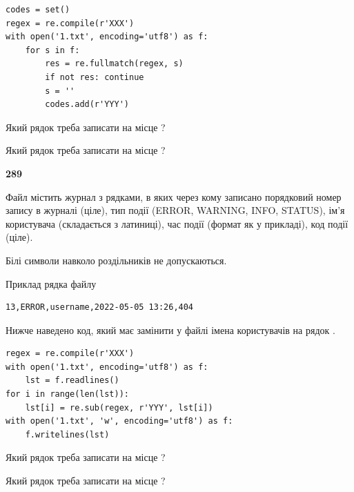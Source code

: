 \begin{verbatim}
codes = set()
regex = re.compile(r'XXX')
with open('1.txt', encoding='utf8') as f:
    for s in f:
        res = re.fullmatch(regex, s)
        if not res: continue
        s = ''
        codes.add(r'YYY')
\end{verbatim}





Який рядок треба записати на місце  ?\par
\vspace{5mm}


Який рядок треба записати на місце  ?\par


\newpage

{\begin {center}\textbf{ 289}\end {center}}\par
Файл  містить журнал з рядками, в яких через кому записано поряд\-ко\-вий номер запису в журналі (ціле), тип події (ERROR, WARNING, INFO, STATUS), ім'я користувача (складається з латиниці), час події (фор\-мат як у прикладі), код події (ціле).

Білі символи навколо роздільників не допускаються.

Приклад рядка файлу



\begin{verbatim}
13,ERROR,username,2022-05-05 13:26,404
\end{verbatim}


Нижче наведено код, який має замінити у файлі імена користувачів на рядок .



\begin{verbatim}
regex = re.compile(r'XXX')
with open('1.txt', encoding='utf8') as f:
    lst = f.readlines()
for i in range(len(lst)):
    lst[i] = re.sub(regex, r'YYY', lst[i])
with open('1.txt', 'w', encoding='utf8') as f:
    f.writelines(lst)
\end{verbatim}







Який рядок треба записати на місце  ?\par
\vspace{5mm}


Який рядок треба записати на місце  ?\par


